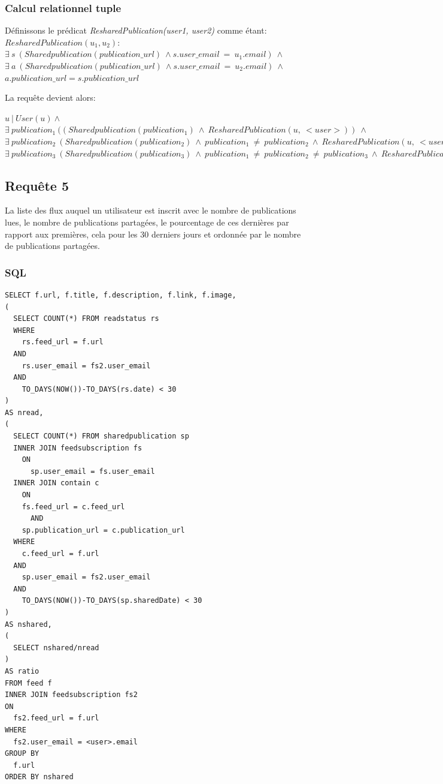 \documentclass[a4paper,10pt]{article}
\begin{document}
\subsubsection{Calcul relationnel tuple}
Définissons le prédicat \emph{ResharedPublication(user1, user2)} comme étant:
\\
      $ResharedPublication(u_1, u_2):\ $\\
	  $\exists\ s\ (Sharedpublication(publication\_url)\ \wedge s.user\_email\ =\ u_1.email)\ \wedge $\\
	  $\exists\ a\ (Sharedpublication(publication\_url)\ \wedge s.user\_email\ =\ u_2.email)\ \wedge $\\
	  $a.publication\_url = s.publication\_url$

La requête devient alors:

       $u\ |\ User(u) \wedge$ \\
       $\exists \ publication_1 \ ((Sharedpublication(publication_1) \ \wedge \ ResharedPublication(u, \ <user>)) \ \wedge$ \\
       $\exists \ publication_2 \ (Sharedpublication(publication_2) \ \wedge \ publication_1 \ \neq \ publication_2 \ \wedge \ ResharedPublication(u, \ <user>)) \ \wedge$ \\
       $\exists \ publication_3 \ (Sharedpublication(publication_3) \ \wedge \ publication_1 \ \neq \ publication_2 \ \neq \ publication_3 \ \wedge  \ ResharedPublication(u, \ <user>)))$
\clearpage
\subsection{Requête 5}
La liste des flux auquel un utilisateur est inscrit avec le nombre de publications lues, le nombre de publications
partagées, le pourcentage de ces dernières par rapport aux premières, cela pour les 30 derniers jours et ordonnée
par le nombre de publications partagées.
\subsubsection{SQL}
\begin{lstlisting}
SELECT f.url, f.title, f.description, f.link, f.image, 
(
  SELECT COUNT(*) FROM readstatus rs 
  WHERE 
    rs.feed_url = f.url
  AND 
    rs.user_email = fs2.user_email
  AND 
    TO_DAYS(NOW())-TO_DAYS(rs.date) < 30
)
AS nread,
(
  SELECT COUNT(*) FROM sharedpublication sp
  INNER JOIN feedsubscription fs 
    ON 
      sp.user_email = fs.user_email
  INNER JOIN contain c 
    ON 
	fs.feed_url = c.feed_url
      AND 
	sp.publication_url = c.publication_url
  WHERE 
    c.feed_url = f.url
  AND 
    sp.user_email = fs2.user_email
  AND 
    TO_DAYS(NOW())-TO_DAYS(sp.sharedDate) < 30
) 
AS nshared,
( 
  SELECT nshared/nread 
)
AS ratio 
FROM feed f
INNER JOIN feedsubscription fs2 
ON 
  fs2.feed_url = f.url
WHERE 
  fs2.user_email = <user>.email 
GROUP BY 
  f.url 
ORDER BY nshared
\end{lstlisting}
\clearpage
\end{document}
